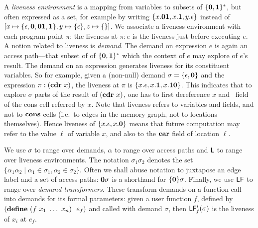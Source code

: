 \documentclass{sig-alternate}
\begin{document}
A {\em liveness environment} is a mapping from variables to subsets of
$\{\mathbf{0},\mathbf{1}\}^\ast$, but  often expressed as a set,  for example by
writing  $\{x.\mathbf{0}\mathbf{1},   x.\mathbf{1},  y.\epsilon\}$  instead   of  $[x
  \mapsto\{\epsilon,\mathbf{0},\mathbf{0}\mathbf{1},\mathbf{1}\},     y\mapsto\{\epsilon\},
  z\mapsto\{\}]$.   We  associate  a  liveness environment  with  each
program  point $\pi$:  the liveness  at $\pi:e$  is the  liveness just
before executing $e$.
A  notion  related  to  liveness  is  {\em  demand}.   The  demand  on
expression  $e$   is  again  an   access  path---that  subset   of  of
$\{\mathbf{0},\mathbf{1}\}^\ast$ which  the context of $e$ may  explore of $e$'s
result.   The  demand on  an  expression  generates  liveness for  its
constituent  variables.  So  for  example, given  a (non-null)  demand
$\sigma =  \lbrace \epsilon, \mathbf{0}  \rbrace$ and the  expression $\pi:
(\mbox{$\mathbf{cdr}$}\  x)$, the liveness  at $\pi$  is $\lbrace  x.\epsilon, x.\mathbf{1},
x.\mathbf{1}\mathbf{0} \rbrace$.  This indicates  that to explore $\sigma$ parts
of the  result of $(\mbox{$\mathbf{cdr}$}\  x)$, one has  to first dereference  $x$ and
\CDR\  field of  the cons  cell referred  by $x$.  Note  that liveness
refers to  variables and  fields, and not  to $\mbox{$\mathbf{cons}$}$ cells  (i.e.\ to
edges  in  the memory  graph,  not  to  locations themselves).   Hence
liveness of $\{x.\epsilon,x.\mathbf{0}\}$ means that future computation may
refer to  the value  $\ell$ of  variable $x$, and  also to  the $\mbox{$\mathbf{car}$}$
field of location $\ell$.



We use $\sigma$  to range over demands, $\alpha$  to range over access
paths  and $\mathsf{L}$  to range  over liveness  environments.  The notation
$\sigma_1\sigma_2$  denotes  the  set $\lbrace  \alpha_1\alpha_2  \mid
\alpha_1 \in  \sigma_1, \alpha_2 \in \sigma_2\rbrace$.  Often we shall
abuse notation to  juxtapose an edge label and a  set of access paths:
$\mathbf{0}\sigma$   is   a   shorthand  for   $\lbrace\mathbf{0}\rbrace\sigma$.
Finally,  we use $\mathsf{LF}$  to range  over {\em  demand transformers}.
These transform demands on a function call into demands for its formal
parameters:    given    a    user    function    $f$,    defined    by
$(\DEFINE\  (f\ x_1\  \ldots\ x_n)\  \  e_f)$ and  called with  demand
$\sigma$, then $\mathsf{LF}_{\mathit f}^{i}( {\mathit \sigma})$ is the liveness of $x_i$ at $e_f$.
\end{document}
